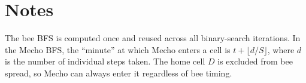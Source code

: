 \documentclass[11pt,a4paper]{article}
\begin{document}
\section{Notes}
The bee BFS is computed once and reused across all binary-search iterations. In the Mecho BFS, the ``minute'' at which Mecho enters a cell is $t + \lfloor d/S \rfloor$, where $d$ is the number of individual steps taken. The home cell $D$ is excluded from bee spread, so Mecho can always enter it regardless of bee timing.
\end{document}
